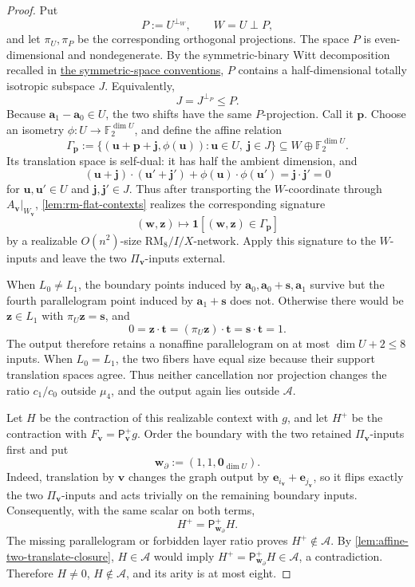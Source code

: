 \documentclass[11pt,letterpaper,onecolumn]{article}
\theoremstyle{plain}
\theoremstyle{definition}
\theoremstyle{remark}
\newcommand{\Ftwo}{\mathbb F_2}
\newcommand{\cA}{\mathscr A}
\newcommand{\one}{\mathbf 1}
\newcommand{\RMcore}{\mathrm{RM}_8}
\begin{document}
\begin{proof}
Put
\[
 P:=U^{\perp_W},
 \qquad
 W=U\perp P,
\]
and let \(\pi_U,\pi_P\) be the corresponding orthogonal projections.  The
space \(P\) is even-dimensional and nondegenerate.  By the
symmetric-binary Witt decomposition recalled in
\hyperref[subsubsec:symmetric-binary-spaces]{the symmetric-space conventions}, \(P\) contains a
half-dimensional totally isotropic subspace \(J\). Equivalently,
\[
 J=J^{\perp_P}\le P.
\]
Because \({\mathbf{a}}_1-{\mathbf{a}}_0\in U\), the two shifts have the same \(P\)-projection.
Call it \({\mathbf{p}}\).  Choose an isometry
\(\phi:U\to\Ftwo^{\dim U}\), and define the affine relation
\[
 \Gamma_{\mathbf{p}}
 :=\{({\mathbf{u}}+{\mathbf{p}}+{\mathbf{j}},\phi({\mathbf{u}})):{\mathbf{u}}\in U,\ {\mathbf{j}}\in J\}
 \subseteq W\oplus\Ftwo^{\dim U}.
\]
Its translation space is self-dual: it has half the ambient dimension, and
\[
 ({\mathbf{u}}+{\mathbf{j}})\cdot({\mathbf{u}}'+{\mathbf{j}}')+\phi({\mathbf{u}})\cdot\phi({\mathbf{u}}')
 ={\mathbf{j}}\cdot {\mathbf{j}}'=0
\]
for \({\mathbf{u}},{\mathbf{u}}'\in U\) and \({\mathbf{j}},{\mathbf{j}}'\in J\).  Thus
after transporting the \(W\)-coordinate through \(A_{\mathbf{v}}|_{W_{\mathbf{v}}}\),
\cref{lem:rm-flat-contexts} realizes the corresponding signature
\[
 ({\mathbf{w}},{\mathbf{z}})\longmapsto\one[({\mathbf{w}},{\mathbf{z}})\in\Gamma_{\mathbf{p}}]
\]
by a realizable \(O(n^2)\)-size \(\RMcore/I/X\)-network.  Apply this signature
to the \(W\)-inputs and leave the two \(\Pi_{\mathbf{v}}\)-inputs external.

When \(L_0\ne L_1\), the boundary points induced by
\({\mathbf{a}}_0,{\mathbf{a}}_0+{\mathbf{s}},{\mathbf{a}}_1\) survive but the fourth parallelogram point induced by
\({\mathbf{a}}_1+{\mathbf{s}}\) does not.  Otherwise there would be \({\mathbf{z}}\in L_1\) with
\(\pi_U{\mathbf{z}}={\mathbf{s}}\), and
\[
  0={\mathbf{z}}\cdot {\mathbf{t}}=(\pi_U{\mathbf{z}})\cdot {\mathbf{t}}={\mathbf{s}}\cdot {\mathbf{t}}=1.
\]
The output therefore retains a nonaffine parallelogram on at most
\(\dim U+2\le8\) inputs.  When \(L_0=L_1\), the two fibers have
equal size because their support translation spaces agree.  Thus neither
cancellation nor projection changes the ratio \(c_1/c_0\) outside
\(\mu_4\), and the output again lies outside \(\cA\).

Let \(H\) be the contraction of this realizable context with \(g\), and let
\(H^+\) be the contraction with \(F_{\mathbf{v}}=\mathsf P_{\mathbf{v}}^+g\).  Order the boundary
with the two retained \(\Pi_{\mathbf{v}}\)-inputs first and put
\[
 {\mathbf{w}}_\partial:=(1,1,\mathbf 0_{\dim U}).
\]
Indeed, translation by \({\mathbf{v}}\) changes the graph output by
\({\mathbf{e}}_{i_{\mathbf{v}}}+{\mathbf{e}}_{j_{\mathbf{v}}}\), so it flips exactly the two \(\Pi_{\mathbf{v}}\)-inputs and acts
trivially on the remaining boundary inputs.  Consequently, with the same
scalar on both terms,
\[
 H^+=\mathsf P_{{\mathbf{w}}_\partial}^+H.
\]
The missing parallelogram or forbidden layer ratio proves
\(H^+\notin\cA\).  By \cref{lem:affine-two-translate-closure},
\(H\in\cA\) would imply \(H^+=\mathsf P_{{\mathbf{w}}_\partial}^+H\in\cA\), a
contradiction.  Therefore \(H\ne0\), \(H\notin\cA\), and its arity is at
most eight.
\end{proof}
\end{document}
